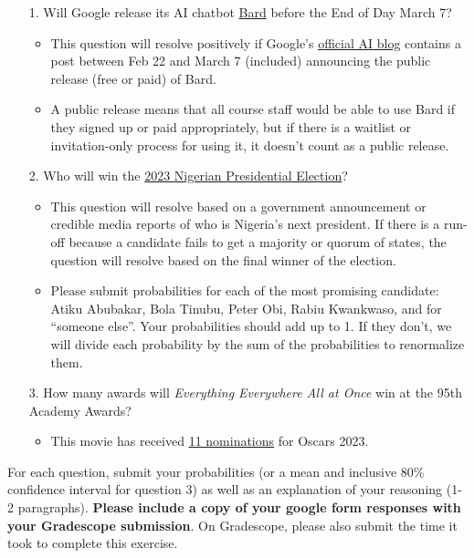 \documentclass[11pt]{article}
\begin{document}
\begin{enumerate}
	\item[1.] Will Google release its AI chatbot \href{https://blog.google/technology/ai/bard-google-ai-search-updates/}{Bard} before the End of Day March 7?
	\begin{itemize}
		\item This question will resolve positively if Google's \href{https://blog.google/technology/ai/}{official AI blog} contains a post between Feb 22 and March 7 (included) announcing the public release (free or paid) of Bard. 
        \item A public release means that all course staff would be able to use Bard if they signed up or paid appropriately, but if there is a waitlist or invitation-only process for using it, it doesn't count as a public release. 
	\end{itemize} 
	\item[2.] Who will win the \href{https://www.bbc.com/news/world-africa-64496042}{2023 Nigerian Presidential Election}?
	\begin{itemize}
		\item This question will resolve based on a government announcement or credible media reports of who is Nigeria's next president. If there is a run-off because a candidate fails to get a majority or quorum of states, the question will resolve based on the final winner of the election. 
        \item Please submit probabilities for each of the most promising candidate: Atiku Abubakar, Bola Tinubu, Peter Obi, Rabiu Kwankwaso, and for ``someone else''. Your probabilities should add up to 1. If they don't, we will divide each probability by the sum of the probabilities to renormalize them.
    \end{itemize}

	\item[3.] How many awards will \emph{Everything Everywhere All at Once} win at the 95th Academy Awards?
	\begin{itemize}
		\item This movie has received \href{https://www.imdb.com/title/tt6710474/awards/}{11 nominations} for Oscars 2023.  
	\end{itemize} 
\end{enumerate}

For each question, submit your probabilities (or a mean and inclusive 80\% confidence interval for question 3) as well as an explanation of your reasoning (1-2 paragraphs). \textbf{Please include a copy of your google form responses with your Gradescope submission}. On Gradescope, please also submit the time it took to complete this exercise.
\end{document}
